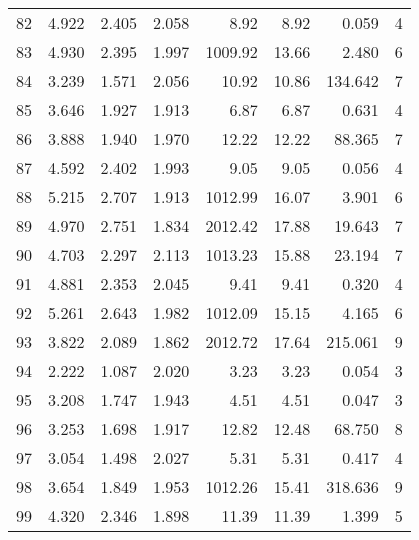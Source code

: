 \begin{tabular}{lrrrrrrr}
82 &     4.922 &      2.405 &      2.058 &     8.92 &     8.92 &    0.059 &        4 \\
83 &     4.930 &      2.395 &      1.997 &  1009.92 &    13.66 &    2.480 &        6 \\
84 &     3.239 &      1.571 &      2.056 &    10.92 &    10.86 &  134.642 &        7 \\
85 &     3.646 &      1.927 &      1.913 &     6.87 &     6.87 &    0.631 &        4 \\
86 &     3.888 &      1.940 &      1.970 &    12.22 &    12.22 &   88.365 &        7 \\
87 &     4.592 &      2.402 &      1.993 &     9.05 &     9.05 &    0.056 &        4 \\
88 &     5.215 &      2.707 &      1.913 &  1012.99 &    16.07 &    3.901 &        6 \\
89 &     4.970 &      2.751 &      1.834 &  2012.42 &    17.88 &   19.643 &        7 \\
90 &     4.703 &      2.297 &      2.113 &  1013.23 &    15.88 &   23.194 &        7 \\
91 &     4.881 &      2.353 &      2.045 &     9.41 &     9.41 &    0.320 &        4 \\
92 &     5.261 &      2.643 &      1.982 &  1012.09 &    15.15 &    4.165 &        6 \\
93 &     3.822 &      2.089 &      1.862 &  2012.72 &    17.64 &  215.061 &        9 \\
94 &     2.222 &      1.087 &      2.020 &     3.23 &     3.23 &    0.054 &        3 \\
95 &     3.208 &      1.747 &      1.943 &     4.51 &     4.51 &    0.047 &        3 \\
96 &     3.253 &      1.698 &      1.917 &    12.82 &    12.48 &   68.750 &        8 \\
97 &     3.054 &      1.498 &      2.027 &     5.31 &     5.31 &    0.417 &        4 \\
98 &     3.654 &      1.849 &      1.953 &  1012.26 &    15.41 &  318.636 &        9 \\
99 &     4.320 &      2.346 &      1.898 &    11.39 &    11.39 &    1.399 &        5 \\
\bottomrule
\end{tabular}
